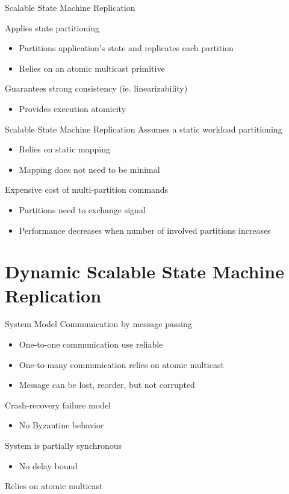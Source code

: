 \documentclass[10pt]{beamer}
\begin{document}
\begin{frame}[fragile]{Scalable State Machine Replication}

  Applies state partitioning
  \begin{itemize}
    \item Partitions application's state and replicates each partition
    \item Relies on an atomic multicast primitive %
  \end{itemize}

  Guarantees strong consistency (ie. linearizability)
  \begin{itemize}
    \item Provides execution atomicity
  \end{itemize}

  
\end{frame}

\begin{frame}[fragile]{Scalable State Machine Replication}
  Assumes a static workload partitioning
  \begin{itemize}
    \item Relies on static mapping
    \item Mapping does not need to be minimal
  \end{itemize}
  Expensive cost of multi-partition commands
  \begin{itemize}
    \item Partitions need to exchange signal
    \item Performance decreases when number of involved partitions increases
  \end{itemize}
  
\end{frame}

\section{Dynamic Scalable State Machine Replication}

\begin{frame}{System Model}
  Communication by message passing
  \begin{itemize}
    \item One-to-one communication use reliable 
    \item One-to-many communication relies on atomic multicast
    \item Message can be lost, reorder, but not corrupted
  \end{itemize}
  Crash-recovery failure model
  \begin{itemize}
    \item No Byzantine behavior
  \end{itemize}
  System is partially synchronous
  \begin{itemize}
    \item No delay bound
  \end{itemize}
  Relies on atomic multicast
\end{frame}
\end{document}
